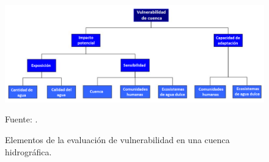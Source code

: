 \begin{figure}
	\includegraphics[scale=0.8]{Images/Nelitz01.png}
	\centering
	\caption{Elementos de la evaluación de vulnerabilidad en una cuenca hidrográfica.}
	Fuente: \citet{nelitz2013tools}.
	\label{fig:Nelitz01}
\end{figure}
